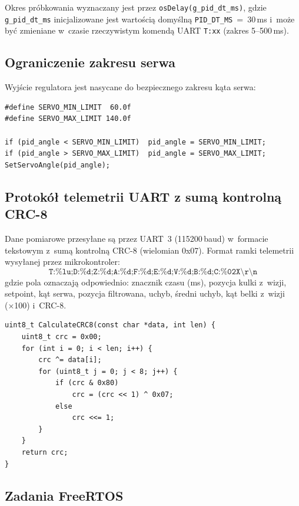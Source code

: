 Okres próbkowania wyznaczany jest przez \texttt{osDelay(g\_pid\_dt\_ms)},
gdzie \texttt{g\_pid\_dt\_ms} inicjalizowane jest wartością domyślną
\texttt{PID\_DT\_MS}~=~30\,ms i~może być zmieniane w~czasie rzeczywistym
komendą UART \texttt{T:xx} (zakres 5--500\,ms).

\subsection{Ograniczenie zakresu serwa}

Wyjście regulatora jest nasycane do bezpiecznego zakresu kąta serwa:

\begin{lstlisting}[style=cstyle, caption={Saturacja wyjścia i ograniczenia serwa (main.c)}]
#define SERVO_MIN_LIMIT  60.0f
#define SERVO_MAX_LIMIT 140.0f

if (pid_angle < SERVO_MIN_LIMIT)  pid_angle = SERVO_MIN_LIMIT;
if (pid_angle > SERVO_MAX_LIMIT)  pid_angle = SERVO_MAX_LIMIT;
SetServoAngle(pid_angle);
\end{lstlisting}

\subsection{Protokół telemetrii UART z sumą kontrolną CRC-8}

Dane pomiarowe przesyłane są przez UART~3 (115200\,baud) w~formacie
tekstowym z~sumą kontrolną CRC-8 (wielomian 0x07).
Format ramki telemetrii wysyłanej przez mikrokontroler:
\[
  \texttt{T:\%lu;D:\%d;Z:\%d;A:\%d;F:\%d;E:\%d;V:\%d;B:\%d;C:\%02X\textbackslash r\textbackslash n}
\]
gdzie pola oznaczają odpowiednio: znacznik czasu (ms), pozycja kulki z~wizji,
setpoint, kąt serwa, pozycja filtrowana, uchyb, średni uchyb,
kąt belki z~wizji (×100) i~CRC-8.

\begin{lstlisting}[style=cstyle, caption={Implementacja CRC-8 (crc8.c)}]
uint8_t CalculateCRC8(const char *data, int len) {
    uint8_t crc = 0x00;
    for (int i = 0; i < len; i++) {
        crc ^= data[i];
        for (uint8_t j = 0; j < 8; j++) {
            if (crc & 0x80)
                crc = (crc << 1) ^ 0x07;
            else
                crc <<= 1;
        }
    }
    return crc;
}
\end{lstlisting}

\subsection{Zadania FreeRTOS}

